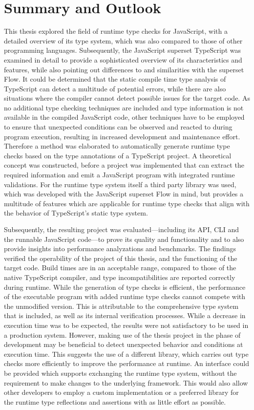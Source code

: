 \chapter{Summary and Outlook}
\label{cha:summary_outlook}

This thesis explored the field of runtime type checks for JavaScript, with a detailed overview of its type system, which was also compared to those of other programming languages. Subsequently, the JavaScript superset TypeScript was examined in detail to provide a sophisticated overview of its characteristics and features, while also pointing out differences to and similarities with the superset Flow. It could be determined that the static compile time type analysis of TypeScript can detect a multitude of potential errors, while there are also situations where the compiler cannot detect possible issues for the target code. As no additional type checking techniques are included and type information is not available in the compiled JavaScript code, other techniques have to be employed to ensure that unexpected conditions can be observed and reacted to during program execution, resulting in increased development and maintenance effort. Therefore a method was elaborated to automatically generate runtime type checks based on the type annotations of a TypeScript project. A theoretical concept was constructed, before a project was implemented that can extract the required information and emit a JavaScript program with integrated runtime validations. For the runtime type system itself a third party library was used, which was developed with the JavaScript superset Flow in mind, but provides a multitude of features which are applicable for runtime type checks that align with the behavior of TypeScript's static type system.

Subsequently, the resulting project was evaluated---including its API, CLI and the runnable JavaScript code---to prove its quality and functionality and to also provide insights into performance analyzations and benchmarks. The findings verified the operability of the project of this thesis, and the functioning of the target code. Build times are in an acceptable range, compared to those of the native TypeScript compiler, and type incompatibilities are reported correctly during runtime. While the generation of type checks is efficient, the performance of the executable program with added runtime type checks cannot compete with the unmodified version. This is attributable to the comprehensive type system that is included, as well as its internal verification processes. While a decrease in execution time was to be expected, the results were not satisfactory to be used in a production system. However, making use of the thesis project in the phase of development may be beneficial to detect unexpected behavior and conditions at execution time. This suggests the use of a different library, which carries out type checks more efficiently to improve the performance at runtime. An interface could be provided which supports exchanging the runtime type system, without the requirement to make changes to the underlying framework. This would also allow other developers to employ a custom implementation or a preferred library for the runtime type reflections and assertions with as little effort as possible.

